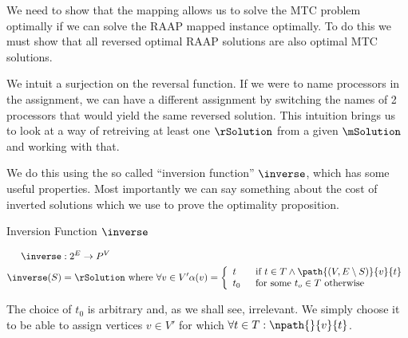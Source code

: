 We need to show that the mapping allows us to solve the MTC problem optimally if we can solve the RAAP mapped instance optimally.
To do this we must show that all reversed optimal RAAP solutions are also optimal MTC solutions.

We intuit a surjection on the reversal function.
If we were to name processors in the assignment, we can have a different assignment by switching the names of 2 processors that would yield the same reversed solution.
This intuition brings us to look at a way of retreiving at least one $\rSolution$ from a given $\mSolution$ and working with that.

We do this using the so called ``inversion function'' $\inverse$, which has some useful properties.
Most importantly we can say something about the cost of inverted solutions which we use to prove the optimality proposition.

\begin{definition}
Inversion Function $\inverse$

\begin{align}
	\nonumber \inverse & : 2^E \rightarrow P^V \\
	\nonumber \inverse(S) & = \rSolution \mbox{ where } \forall v \in V' \alpha(v) = \mbox{$\left\{ 
		\begin{array}{l l}
			t \quad & \mbox{if $t \in T \wedge \path{(V,E \setminus S)}{v}{t}$}\\
			t_0 & \mbox{for some $t_o \in T$ otherwise}\\ \end{array} \right.$} 
\end{align}

The choice of $t_0$ is arbitrary and, as we shall see, irrelevant.
We simply choose it to be able to assign vertices $v \in V'$ for which $\forall t \in T : \npath{}{v}{t}$.
\end{definition}

